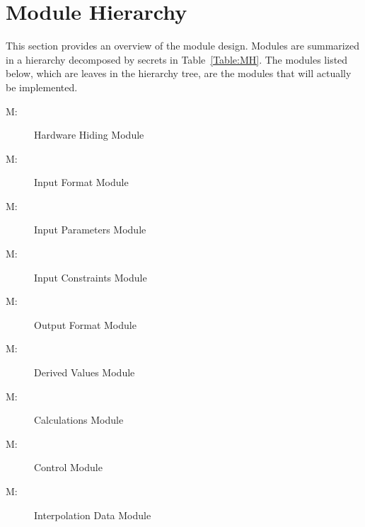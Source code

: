 \documentclass[12pt]{article}
\newcounter{modnum}
\newcommand{\mthemodnum}{M\themodnum}
\begin{document}
\section{Module Hierarchy}
\label{Sec:MH}
This section provides an overview of the module design. Modules are summarized in a hierarchy decomposed by secrets in Table~\ref{Table:MH}. The modules listed below, which are leaves in the hierarchy tree, are the modules that will actually be implemented.
\begin{description}
\item[\mthemodnum\label{Mhardwarehiding}:]Hardware Hiding Module
\end{description}
\begin{description}
\item[\mthemodnum\label{Minputformat}:]Input Format Module
\end{description}
\begin{description}
\item[\mthemodnum\label{Minputparameters}:]Input Parameters Module
\end{description}
\begin{description}
\item[\mthemodnum\label{Minputconstraints}:]Input Constraints Module
\end{description}
\begin{description}
\item[\mthemodnum\label{Moutputformat}:]Output Format Module
\end{description}
\begin{description}
\item[\mthemodnum\label{Mderivedvalues}:]Derived Values Module
\end{description}
\begin{description}
\item[\mthemodnum\label{Mcalculations}:]Calculations Module
\end{description}
\begin{description}
\item[\mthemodnum\label{Mcontrol}:]Control Module
\end{description}
\begin{description}
\item[\mthemodnum\label{Minterpolationdata}:]Interpolation Data Module
\end{description}
\end{document}
